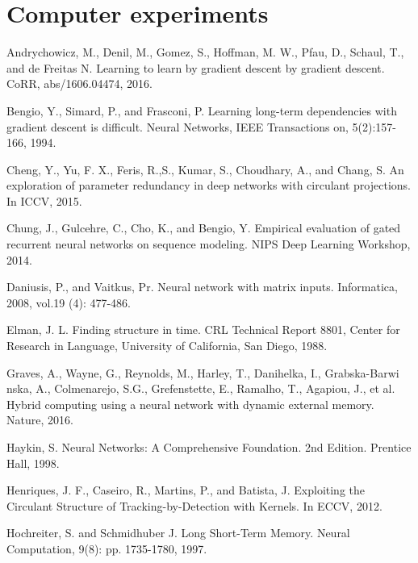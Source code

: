 \documentclass[a4paper,11pt]{article}
\begin{document}
\noindent 


\section{Computer experiments}






\begin{thebibliography}{1}



 Andrychowicz, M.,  Denil, M., Gomez, S., Hoffman, M. W., Pfau, D., Schaul, T., and de Freitas N.  Learning to learn by gradient descent by gradient descent. CoRR, abs/1606.04474, 2016.

 Bengio,  Y.,  Simard,  P.,  and  Frasconi, P. Learning long-term dependencies with gradient descent is difficult. Neural Networks, IEEE Transactions on, 5(2):157-166, 1994.

 Cheng, Y., Yu, F. X., Feris, R.,S., Kumar, S., Choudhary, A., and Chang, S.  An exploration of parameter redundancy in deep networks with circulant projections. In
ICCV, 2015.


 Chung, J., Gulcehre, C., Cho, K., and Bengio, Y. Empirical evaluation of gated recurrent neural networks on sequence modeling. NIPS Deep Learning Workshop, 2014.

 Daniusis, P., and Vaitkus, Pr. Neural network with matrix inputs. Informatica, 2008, vol.19 (4): 477-486.


 Elman, J. L. Finding structure in time.  CRL Technical Report 8801, Center for Research in Language, University
of California, San Diego, 1988.

  Graves, A., Wayne, G., Reynolds, M.,  Harley, T., Danihelka, I., Grabska-Barwi
 nska, A., Colmenarejo, S.G., Grefenstette, E., Ramalho, T., Agapiou, J., et al. Hybrid computing using a neural network with dynamic external memory. Nature, 2016.



 Haykin, S. Neural Networks: A Comprehensive Foundation. 2nd Edition. Prentice Hall, 1998.


 Henriques,  J. F.,  Caseiro, R.,  Martins, P.,  and Batista, J.   Exploiting the Circulant Structure of Tracking-by-Detection with Kernels.   In ECCV, 2012.


 Hochreiter, S.  and  Schmidhuber J. Long  Short-Term  Memory. Neural  Computation, 9(8): pp. 1735-1780, 1997.




\end{thebibliography}
\end{document}
